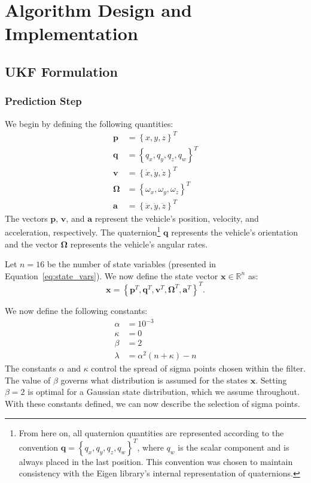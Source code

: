 \chapter{Algorithm Design and Implementation} \label{ch:alg_design}

\section{UKF Formulation}

\subsection{Prediction Step}

We begin by defining the following quantities:
%
\begin{align} \label{eq:state_vars}
\mathbf{p} &= \left\lbrace x, y, z \right\rbrace ^{T} \\
\mathbf{q} &= \left\lbrace q_{x}, q_{y}, q_{z}, q_{w} \right\rbrace ^{T} \\
\mathbf{v} &= \left\lbrace \dot{x}, \dot{y}, \dot{z} \right\rbrace ^{T} \\
\mathbf{\Omega} &= \left\lbrace \omega_{x}, \omega_{y}, \omega_{z} \right\rbrace ^{T} \\
\mathbf{a} &= \left\lbrace \ddot{x}, \ddot{y}, \ddot{z} \right\rbrace ^{T}
\end{align}
%
The vectors $\mathbf{p}$, $\mathbf{v}$, and $\mathbf{a}$ represent the vehicle's position, velocity, and acceleration, respectively. The quaternion\footnote{From here on, all quaternion quantities are represented according to the convention $\mathbf{q} = \left\lbrace q_{x}, q_{y}, q_{z}, q_{w} \right\rbrace ^{T}$, where $q_{w}$ is the scalar component and is always placed in the last position. This convention was chosen to maintain consistency with the Eigen library's internal representation of quaternions.} $\mathbf{q}$ represents the vehicle's orientation and the vector $\mathbf{\Omega}$ represents the vehicle's angular rates. 

Let $n = 16$ be the number of state variables (presented in Equation~\ref{eq:state_vars}). We now define the state vector $\mathbf{x} \in \mathbb{R}^{n}$ as:
%
\begin{equation}
\mathbf{x} = 
\left\lbrace
    \mathbf{p}^{T},
    \mathbf{q}^{T},
    \mathbf{v}^{T},
    \mathbf{\Omega}^{T},
    \mathbf{a}^{T}
\right\rbrace ^{T}.
\end{equation}

We now define the following constants:
%
\begin{align}
\alpha &= 10^{-3} \nonumber \\
\kappa &= 0 \\
\beta &= 2 \nonumber \\
\lambda &= \alpha^{2} \left( n + \kappa \right) - n \nonumber
\end{align}
%
The constants $\alpha$ and $\kappa$ control the spread of sigma points chosen within the filter. The value of $\beta$ governs what distribution is assumed for the states $\mathbf{x}$. Setting $\beta = 2$ is optimal for a Gaussian state distribution, which we assume throughout. With these constants defined, we can now describe the selection of sigma points.

